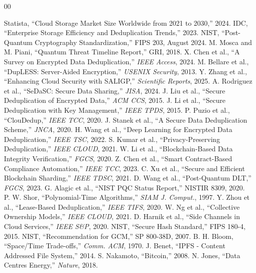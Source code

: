\documentclass[conference]{IEEEtran}
\begin{document}
\begin{thebibliography}{00}

 Statista, ``Cloud Storage Market Size Worldwide from 2021 to 2030,'' 2024.
 IDC, ``Enterprise Storage Efficiency and Deduplication Trends,'' 2023.
 NIST, ``Post-Quantum Cryptography Standardization,'' FIPS 203, August 2024.
 M. Mosca and M. Piani, ``Quantum Threat Timeline Report,'' GRI, 2018.
 X. Chen et al., ``A Survey on Encrypted Data Deduplication,'' \textit{IEEE Access}, 2024.
 M. Bellare et al., ``DupLESS: Server-Aided Encryption,'' \textit{USENIX Security}, 2013.
 Y. Zhang et al., ``Enhancing Cloud Security with SALIGP,'' \textit{Scientific Reports}, 2025.
 A. Rodriguez et al., ``SeDaSC: Secure Data Sharing,'' \textit{JISA}, 2024.
 J. Liu et al., ``Secure Deduplication of Encrypted Data,'' \textit{ACM CCS}, 2015.
 J. Li et al., ``Secure Deduplication with Key Management,'' \textit{IEEE TPDS}, 2015.
 P. Puzio et al., ``ClouDedup,'' \textit{IEEE TCC}, 2020.
 J. Stanek et al., ``A Secure Data Deduplication Scheme,'' \textit{JNCA}, 2020.
 H. Wang et al., ``Deep Learning for Encrypted Data Deduplication,'' \textit{IEEE TSC}, 2022.
 S. Kumar et al., ``Privacy-Preserving Deduplication,'' \textit{IEEE CLOUD}, 2021.
 W. Li et al., ``Blockchain-Based Data Integrity Verification,'' \textit{FGCS}, 2020.
 Z. Chen et al., ``Smart Contract-Based Compliance Automation,'' \textit{IEEE TCC}, 2023.
 C. Xu et al., ``Secure and Efficient Blockchain Sharding,'' \textit{IEEE TDSC}, 2021.
 D. Wang et al., ``Post-Quantum DLT,'' \textit{FGCS}, 2023.
 G. Alagic et al., ``NIST PQC Status Report,'' NISTIR 8309, 2020.
 P. W. Shor, ``Polynomial-Time Algorithms,'' \textit{SIAM J. Comput.}, 1997.
 Y. Zhou et al., ``Lease-Based Deduplication,'' \textit{IEEE TIFS}, 2020.
 W. Ng et al., ``Collective Ownership Models,'' \textit{IEEE CLOUD}, 2021.
 D. Harnik et al., ``Side Channels in Cloud Services,'' \textit{IEEE S\&P}, 2020.
 NIST, ``Secure Hash Standard,'' FIPS 180-4, 2015.
 NIST, ``Recommendation for GCM,'' SP 800-38D, 2007.
 B. H. Bloom, ``Space/Time Trade-offs,'' \textit{Comm. ACM}, 1970.
 J. Benet, ``IPFS - Content Addressed File System,'' 2014.
 S. Nakamoto, ``Bitcoin,'' 2008.
 N. Jones, ``Data Centres Energy,'' \textit{Nature}, 2018.

\end{thebibliography}
\end{document}
